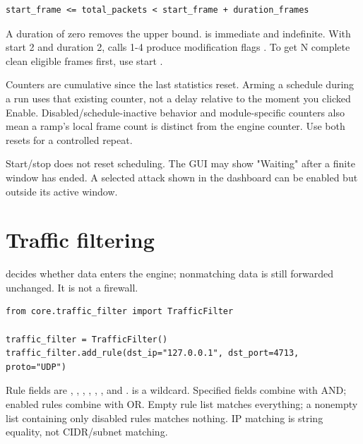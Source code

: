 \par\noindent\begin{minipage}{\linewidth}
\begin{lstlisting}[title={TEXT}]
start_frame <= total_packets < start_frame + duration_frames
\end{lstlisting}
\end{minipage}\par
A duration of zero removes the upper bound.  is immediate and indefinite. With start 2 and duration 2, calls 1-4 produce modification flags . To get N complete clean eligible frames first, use start .

Counters are cumulative since the last statistics reset. Arming a schedule during a run uses that existing counter, not a delay relative to the moment you clicked Enable. Disabled/schedule-inactive behavior and module-specific counters also mean a ramp's local frame count is distinct from the engine counter. Use both resets for a controlled repeat.

Start/stop does not reset scheduling. The GUI may show "Waiting" after a finite window has ended. A selected attack shown in the dashboard can be enabled but outside its active window.

\section*{Traffic filtering}
 decides whether data enters the engine; nonmatching data is still forwarded unchanged. It is not a firewall.

\par\noindent\begin{minipage}{\linewidth}
\begin{lstlisting}[title={PYTHON}]
from core.traffic_filter import TrafficFilter

traffic_filter = TrafficFilter()
traffic_filter.add_rule(dst_ip="127.0.0.1", dst_port=4713, proto="UDP")
\end{lstlisting}
\end{minipage}\par
Rule fields are , , , , , , and .  is a wildcard. Specified fields combine with AND; enabled rules combine with OR. Empty rule list matches everything; a nonempty list containing only disabled rules matches nothing. IP matching is string equality, not CIDR/subnet matching.

